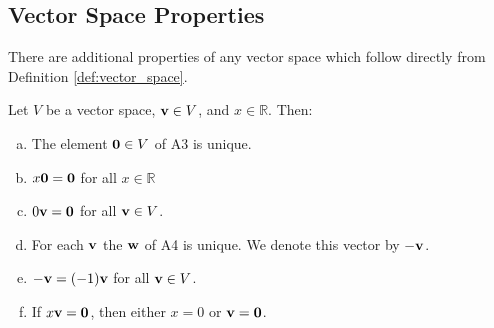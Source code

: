 \documentclass[12pt,letterpaper,reqno]{article}
\numberwithin{equation}{section}
\begin{document}
\subsection{Vector Space Properties}
There are additional properties of any vector space which follow directly from Definition \ref{def:vector_space}.

\begin{thm}\label{thm:properties_of_vector_spaces}
	Let $V$ be a vector space, ${\bf v} \in V$, and $x \in \mathbb{R}$. Then:
	\begin{enumerate}[(a)]
		\item The element ${\bf 0} \in V$ of A3 is unique.
		\item $x{\bf 0}={\bf 0}$ for all $x\in \mathbb{R}$ 
		\item $0{\bf v}={\bf 0}$ for all ${\bf v} \in V$.
		\item For each ${\bf v}$ the ${\bf w}$ of A4 is unique. We denote this vector by $-{\bf v}$.
		\item $-{\bf v}=(-1){\bf v}$ for all ${\bf v} \in  V$.
		\item If $x{\bf v}={\bf 0}$, then either $x=0$ or ${\bf v}={\bf 0}$.
	\end{enumerate}
\end{thm}
\end{document}
